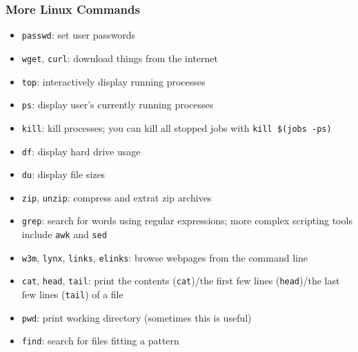 \documentclass[12pt]{article}
\begin{document}
\subsubsection{More Linux Commands} \label{sec:optcmd}
\begin{itemize}
    \item \texttt{passwd}: set user passwords
    \item \texttt{wget}, \texttt{curl}: download things from the internet
    \item \texttt{top}: interactively display running processes
    \item \texttt{ps}: display user's currently running processes
    \item \texttt{kill}: kill processes; you can kill all stopped jobs with \texttt{kill \$(jobs -ps)} %
    \item \texttt{df}: display hard drive usage
    \item \texttt{du}: display file sizes
    \item \texttt{zip}, \texttt{unzip}: compress and extrat zip archives
    \item \texttt{grep}: search for words using regular expressions; more complex scripting tools include \texttt{awk} and \texttt{sed}
    \item \texttt{w3m}, \texttt{lynx}, \texttt{links}, \texttt{elinks}: browse webpages from the command line
    \item \texttt{cat}, \texttt{head}, \texttt{tail}: print the contents (\texttt{cat})/the first few lines (\texttt{head})/the last few lines (\texttt{tail}) of a file
    \item \texttt{pwd}: print working directory (sometimes this is useful)
    \item \texttt{find}: search for files fitting a pattern
\end{itemize}
\end{document}
